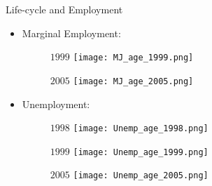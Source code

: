 \documentclass{beamer}
\begin{document}
\begin{frame}{Life-cycle and Employment}
\begin{itemize}
\item Marginal Employment:
\begin{figure}
\begin{minipage}[b]{0.3\textwidth}{$1999$}
\centering
\texttt{[image: MJ\_age\_1999.png]}
\end{minipage}
\begin{minipage}[b]{0.3\textwidth}{$2005$}
\centering
\texttt{[image: MJ\_age\_2005.png]}
\end{minipage}
\end{figure}
\item Unemployment:
\begin{figure}
\begin{minipage}[b]{0.3\textwidth}{$1998$}
\centering
\texttt{[image: Unemp\_age\_1998.png]}
\end{minipage}
\begin{minipage}[b]{0.3\textwidth}{$1999$}
\centering
\texttt{[image: Unemp\_age\_1999.png]}
\end{minipage}
\begin{minipage}[b]{0.3\textwidth}{$2005$}
\centering
\texttt{[image: Unemp\_age\_2005.png]}
\end{minipage}
\end{figure}
\end{itemize}
\end{frame}
\end{document}
